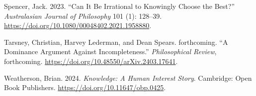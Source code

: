 \documentclass[
  10.5pt,
  twoside]{article}
\newlength{\cslhangindent}
\newenvironment{CSLReferences}[2] %
 {\begin{list}{}{%
  \setlength{\itemindent}{0pt}
  \setlength{\leftmargin}{0pt}
  \setlength{\parsep}{0pt}
  \ifodd #1
   \setlength{\leftmargin}{\cslhangindent}
   \setlength{\itemindent}{-1\cslhangindent}
  \fi
  \setlength{\itemsep}{#2\baselineskip}}}
 {\end{list}}
\begin{document}
\begin{CSLReferences}{1}{0}
Spencer, Jack. 2023. {``Can It Be Irrational to Knowingly Choose the
Best?''} \emph{Australasian Journal of Philosophy} 101 (1): 128--39.
\url{https://doi.org/10.1080/00048402.2021.1958880}.

Tarsney, Christian, Harvey Lederman, and Dean Spears. forthcoming. {``A
Dominance Argument Against Incompleteness.''} \emph{Philosophical
Review}, forthcoming. \url{https://doi.org/10.48550/arXiv.2403.17641}.

Weatherson, Brian. 2024. \emph{Knowledge: A Human Interest Story}.
Cambridge: Open Book Publishers.
\url{https://doi.org/10.11647/obp.0425}.

\end{CSLReferences}
\end{document}

